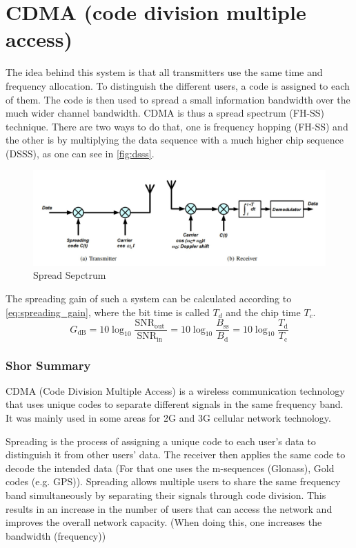 \section{CDMA (code division multiple access)}
The idea behind this system is that all transmitters use the same time and frequency allocation. To distinguish the different users, a code is assigned to each of them. The code is then used to spread a small information bandwidth over the much wider channel bandwidth. CDMA is thus a spread spectrum (FH-SS) technique. There are two ways to do that, one is frequency hopping (FH-SS) and the other is by  multiplying the data sequence with a much higher chip sequence (DSSS), as one can see in \autoref{fig:dsss}.
\begin{figure}[ht]
  \centering
  \includegraphics[width=13cm]{images/spread_spectrum_tx_rx.jpg}
  \caption{Spread Sepctrum}
  \label{fig:dsss}
\end{figure}
The spreading gain of such a system can be calculated according to \autoref{eq:spreading_gain}, where the bit time is called $T_d$ and the chip time $T_c$.
\begin{equation}\label{eq:spreading_gain}
G_{\mathrm{dB}}=10 \log _{10} \frac{\mathrm{SNR}_{\text {out }}}{\mathrm{SNR}_{\text {in }}}=10 \log _{10} \frac{B_{\mathrm{ss}}}{B_{\mathrm{d}}}=10 \log _{10} \frac{T_{\mathrm{d}}}{T_{\mathrm{c}}}
\end{equation}
\subsubsection{Shor Summary}
CDMA (Code Division Multiple Access) is a wireless communication technology that uses unique codes to separate different signals in the same frequency band. It was mainly used in some areas for 2G and 3G cellular network technology.

Spreading is the process of assigning a unique code to each user's data to distinguish it from other users' data. The receiver then applies the same code to decode the intended data (For that one uses the m-sequences (Glonass), Gold codes (e.g. GPS)). Spreading allows multiple users to share the same frequency band simultaneously by separating their signals through code division. This results in an increase in the number of users that can access the network and improves the overall network capacity. (When doing this, one increases the bandwidth (frequency))
